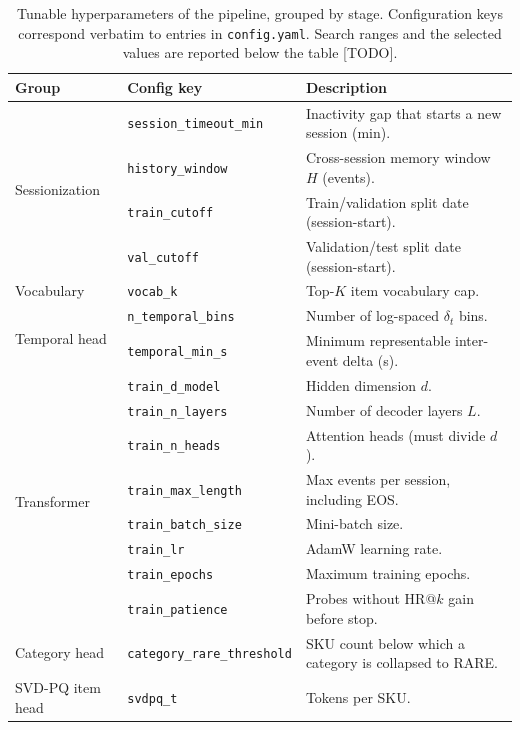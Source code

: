 \documentclass[sigconf,nonacm]{acmart}
\begin{document}
\begin{table}[t]
\caption{Tunable hyperparameters of the pipeline, grouped by stage.
Configuration keys correspond verbatim to entries in \texttt{config.yaml}.
Search ranges and the selected values are reported below the table
[TODO].}
\label{tab:hyperparams}
\small
\begin{tabularx}{\columnwidth}{@{}l l X@{}}
\toprule
Group & Config key & Description \\
\midrule
\multirow{4}{*}{Sessionization}
  & \texttt{session\_timeout\_min} & Inactivity gap that starts a new session (min). \\
  & \texttt{history\_window}       & Cross-session memory window $H$ (events). \\
  & \texttt{train\_cutoff}         & Train/validation split date (session-start). \\
  & \texttt{val\_cutoff}           & Validation/test split date (session-start). \\
\midrule
\multirow{1}{*}{Vocabulary}
  & \texttt{vocab\_k}              & Top-$K$ item vocabulary cap. \\
\midrule
\multirow{2}{*}{Temporal head}
  & \texttt{n\_temporal\_bins}     & Number of log-spaced $\delta_t$ bins. \\
  & \texttt{temporal\_min\_s}      & Minimum representable inter-event delta (s). \\
\midrule
\multirow{8}{*}{Transformer}
  & \texttt{train\_d\_model}       & Hidden dimension $d$. \\
  & \texttt{train\_n\_layers}      & Number of decoder layers $L$. \\
  & \texttt{train\_n\_heads}       & Attention heads (must divide $d$). \\
  & \texttt{train\_max\_length}    & Max events per session, including EOS. \\
  & \texttt{train\_batch\_size}    & Mini-batch size. \\
  & \texttt{train\_lr}             & AdamW learning rate. \\
  & \texttt{train\_epochs}         & Maximum training epochs. \\
  & \texttt{train\_patience}       & Probes without HR@$k$ gain before stop. \\
\midrule
\multirow{1}{*}{Category head}
  & \texttt{category\_rare\_threshold} & SKU count below which a category is collapsed to RARE. \\
\midrule
\multirow{6}{*}{SVD-PQ item head}
  & \texttt{svdpq\_t}                  & Tokens per SKU. \\

\end{tabularx}
\end{table}
\end{document}
